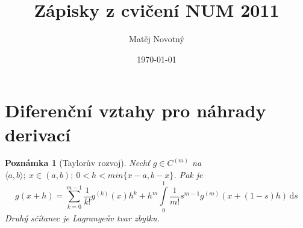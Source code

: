 %
%
%

\usepackage[utf8]{inputenc}
\usepackage[czech]{babel}




\newcommand{\kindle}[2]{\ifthenelse{\boolean{kindle}}{#1}{#2}}

\kindle{\usepackage[top = 1.5cm, bottom=2cm, left=0.8cm, right=0.8cm, a5paper]{geometry}}
{
\usepackage[a4paper]{geometry}
\usepackage{fullpage}
}

\usepackage[pdftex]{graphicx}
\usepackage{ifpdf}
\usepackage[pdftex]{hyperref}

\usepackage{amsmath}
\usepackage{amssymb}
\usepackage{amsthm}
\usepackage{latexsym}

\usepackage{graphicx}


\newtheorem{definition}{Definice}
\newtheorem{theorem}{Věta}
\newtheorem{lemma}{Lemma}
\newtheorem{example}{Příklad}
\newtheorem{note}{Poznámka}

\newcommand{\inte}[2]{\int\limits_0^1 #1\,\mathrm{d}#2}
\newcommand{\R}{\mathbb{R}}
\newcommand{\pa}{\partial}

\title{Zápisky z cvičení NUM 2011}
\author{Matěj Novotný}
\date{\today}

\setlength{\parindent}{0pt}



	
	\maketitle
	\section{Diferenční vztahy pro náhrady derivací}
	
	\kindle{
		\thispagestyle{empty}
		\pagestyle{empty}
	}{}
	
	\begin{note}[Taylorův rozvoj]
		Nechť $g \in C^{(m)}$ na $\langle a,b \rangle;\ x\in (a,b);\ 0<h<min\{x-a,b-x\}$. Pak je
		\begin{equation} \label{diference}
			g(x+h)=\sum_{k=0}^{m-1} \frac{1}{k!} g^{(k)}(x) h^k +
			h^m\inte{\frac{1}{m!} s^{m-1} g^{(m)} (x+(1-s)h)}{s}
		\end{equation}
		Druhý sčítanec je Lagrangeův tvar zbytku.
	\end{note}
	
